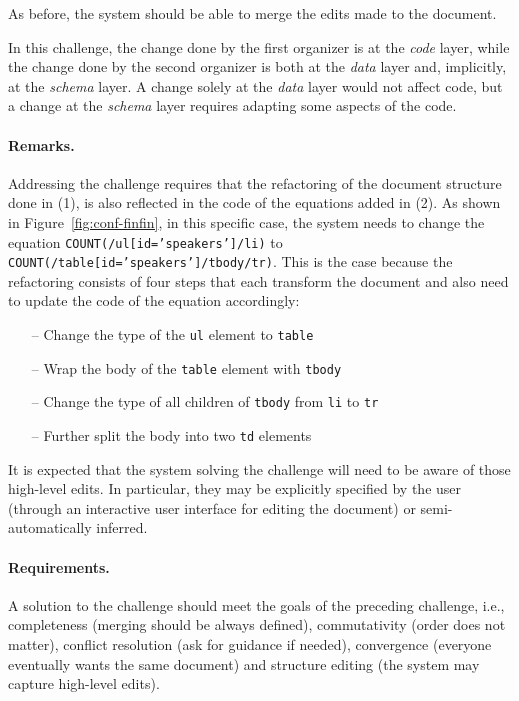 \documentclass[english,submission]{programming}
\DeclareRobustCommand{\frameworkbox}[2][gray!15]{
\begin{tcolorbox}[breakable,left=3pt,right=3pt,top=3pt,bottom=3pt,colback=#1,colframe=#1,parbox=false,
  width=\dimexpr\textwidth\relax,enlarge left by=0mm,boxsep=5pt,arc=0pt,enlarge top by=0.5em,%
  outer arc=0pt]\setlength{\parskip}{0.5em}\setlength{\parindent}{0em}{\firamedium Framework perspective.}\quad #2
\end{tcolorbox}}
\begin{document}
\noindent
As before, the system should be able to merge the edits made to the document.

\frameworkbox{
In this challenge, the change done by the first organizer is at the \emph{code} layer, while
the change done by the second organizer is both at the \emph{data} layer and, implicitly,
at the \emph{schema} layer. A change solely at the \emph{data} layer would not affect code,
but a change at the \emph{schema} layer requires adapting some aspects of the code.
}

\paragraph{Remarks.}
Addressing the challenge requires that the refactoring of the document structure done in (1),
is also reflected in the code of the equations added in (2). As shown in
Figure~\ref{fig:conf-finfin}, in this specific case, the system needs to change the equation
\texttt{COUNT(/ul[id='speakers']/li)} to \texttt{COUNT(/table[id='speakers']/tbody/tr)}.
This is the case because the refactoring consists of four steps that each transform the
document and also need to update the code of the equation accordingly:

\begin{itemize}
    \item[--] Change the type of the \texttt{ul} element to \texttt{table}
    \item[--] Wrap the body of the \texttt{table} element with \texttt{tbody}
    \item[--] Change the type of all children of \texttt{tbody} from \texttt{li} to \texttt{tr}
    \item[--] Further split the body into two \texttt{td} elements
\end{itemize}

\noindent
It is expected that the system solving the challenge will need to be aware of those high-level
edits. In particular, they may be explicitly specified by the user (through an interactive
user interface for editing the document) or semi-automatically inferred.

\paragraph{Requirements.}
A solution to the challenge should meet the goals of the preceding challenge, i.e., completeness
(merging should be always defined), commutativity (order does not matter), conflict resolution
(ask for guidance if needed), convergence (everyone eventually wants the same document) and
structure editing (the system may capture high-level edits).
\end{document}
